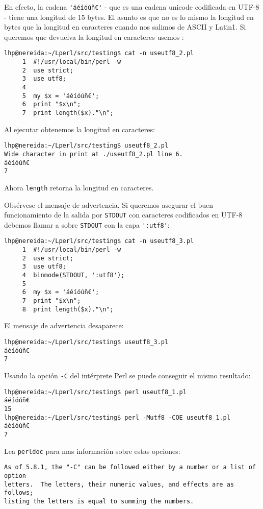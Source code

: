 \begin{htmlonly}
\begin{htmlonly}
En efecto, la cadena \verb|'áéíóúñ€'| 
- que es una cadena unicode codificada en UTF-8 -
tiene una longitud de 15 bytes. El asunto es que 
no es lo mismo la longitud en bytes que la longitud en caracteres cuando nos salimos de ASCII
y Latin1. Si queremos
que  devuelva la longitud en caracteres usemos :
\begin{verbatim}
lhp@nereida:~/Lperl/src/testing$ cat -n useutf8_2.pl
     1  #!/usr/local/bin/perl -w
     2  use strict;
     3  use utf8;
     4
     5  my $x = 'áéíóúñ€';
     6  print "$x\n";
     7  print length($x)."\n";
\end{verbatim}
Al ejecutar obtenemos la longitud en caracteres:
\begin{verbatim}
lhp@nereida:~/Lperl/src/testing$ useutf8_2.pl
Wide character in print at ./useutf8_2.pl line 6.
áéíóúñ€
7
\end{verbatim}
Ahora \verb|length| retorna la longitud en caracteres.

Obsérvese el mensaje de advertencia.  Si queremos asegurar el buen funcionamiento
de la salida por \verb|STDOUT| con caracteres codificados en UTF-8 
debemos
llamar a  sobre \verb|STDOUT| con la capa \verb|':utf8'|:

\begin{verbatim}
lhp@nereida:~/Lperl/src/testing$ cat -n useutf8_3.pl
     1  #!/usr/local/bin/perl -w
     2  use strict;
     3  use utf8;
     4  binmode(STDOUT, ':utf8');
     5
     6  my $x = 'áéíóúñ€';
     7  print "$x\n";
     8  print length($x)."\n";
\end{verbatim}
El mensaje de advertencia desaparece:
\begin{verbatim}
lhp@nereida:~/Lperl/src/testing$ useutf8_3.pl
áéíóúñ€
7
\end{verbatim}
Usando la opción \verb|-C| del intérprete Perl se puede conseguir el mismo resultado:

\begin{verbatim}
lhp@nereida:~/Lperl/src/testing$ perl useutf8_1.pl
áéíóúñ€
15
lhp@nereida:~/Lperl/src/testing$ perl -Mutf8 -COE useutf8_1.pl
áéíóúñ€
7
\end{verbatim}

Lea \verb|perldoc|  para mas información sobre estas
opciones:

\begin{verbatim}
As of 5.8.1, the "-C" can be followed either by a number or a list of option
letters.  The letters, their numeric values, and effects are as follows;
listing the letters is equal to summing the numbers.


\end{verbatim}
\end{htmlonly}
\end{htmlonly}
